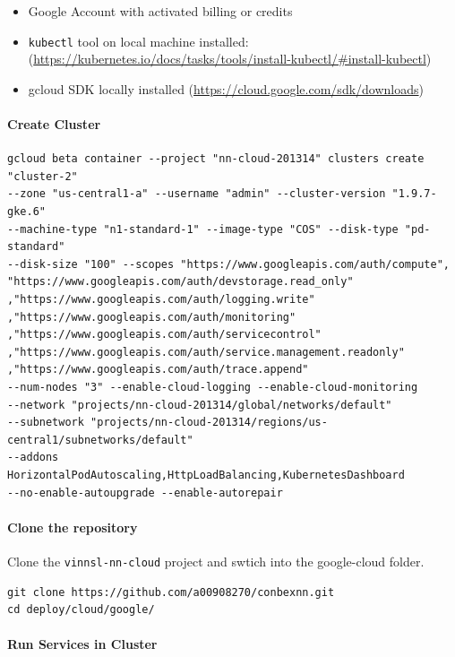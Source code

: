 \begin{itemize}
\item
  Google Account with activated billing or credits
\item
  \texttt{kubectl} tool on local machine installed:
  (\url{https://kubernetes.io/docs/tasks/tools/install-kubectl/\#install-kubectl})
\item
  gcloud SDK locally installed
  (\url{https://cloud.google.com/sdk/downloads})
\end{itemize}

\paragraph{Create Cluster}\label{create-cluster}

\begin{verbatim}
gcloud beta container --project "nn-cloud-201314" clusters create "cluster-2"
--zone "us-central1-a" --username "admin" --cluster-version "1.9.7-gke.6"
--machine-type "n1-standard-1" --image-type "COS" --disk-type "pd-standard"
--disk-size "100" --scopes "https://www.googleapis.com/auth/compute",
"https://www.googleapis.com/auth/devstorage.read_only"
,"https://www.googleapis.com/auth/logging.write"
,"https://www.googleapis.com/auth/monitoring"
,"https://www.googleapis.com/auth/servicecontrol"
,"https://www.googleapis.com/auth/service.management.readonly"
,"https://www.googleapis.com/auth/trace.append" 
--num-nodes "3" --enable-cloud-logging --enable-cloud-monitoring 
--network "projects/nn-cloud-201314/global/networks/default" 
--subnetwork "projects/nn-cloud-201314/regions/us-central1/subnetworks/default" 
--addons HorizontalPodAutoscaling,HttpLoadBalancing,KubernetesDashboard 
--no-enable-autoupgrade --enable-autorepair
\end{verbatim}

\paragraph{Clone the repository}\label{clone-the-repository}

Clone the \texttt{vinnsl-nn-cloud} project and swtich into the
google-cloud folder.

\begin{verbatim}
git clone https://github.com/a00908270/conbexnn.git
cd deploy/cloud/google/
\end{verbatim}

\paragraph{Run Services in Cluster}\label{run-services-in-cluster-1}


